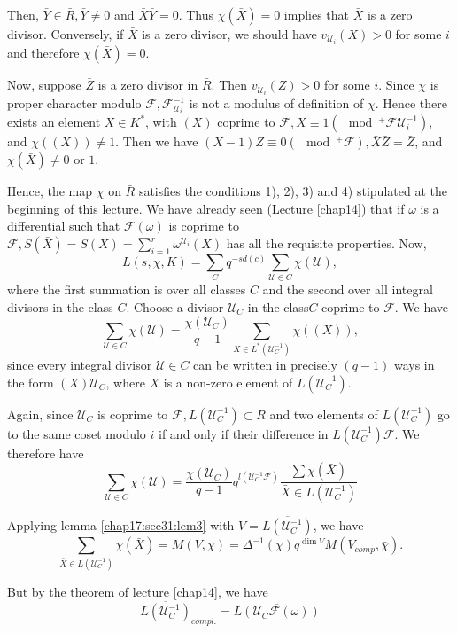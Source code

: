 Then, $\bar{Y} \in \bar{R}, \bar{Y}\neq 0$ and
$\bar{X}\bar{Y}=0$. Thus $\chi (\bar{X})=0$ implies that $\bar{X}$  is
a zero divisor. Conversely, if $\bar{X}$ is a zero divisor, we should
have $v_{\mathscr{U}_i}(X)>0$ for some $i$ and therefore $\chi
(\bar{X})=0$. 

Now, suppose $\bar{Z}$ is a zero divisor in $\bar{R}$. Then
$v_{\mathscr{U}_i}(Z)>0$ for some $i$. Since $\chi$ is proper
character modulo $\mathcal{F},\mathcal{F}_{\mathscr{U}_i}^{-1}$ is not
a modulus of definition of $\chi$. Hence there exists an element $X
\in K^*$, with $(X)$ coprime to $\mathcal{F}, X \equiv 1 (\mod^+
\mathcal{F} \mathscr{U}_i^{-1})$, and $\chi((X))\neq 1$. Then we
have $(X-1)Z \equiv 0(\mod^+ \mathcal{F}), \bar{X}\bar{Z}=\bar{Z}$,
and $\chi(\bar{X})\neq 0$ or $1$. 

Hence, the map $\chi$ on $\bar{R}$ satisfies the conditions 1), 2), 3)
and 4) stipulated at the beginning of this lecture. We have already
seen (Lecture \ref{chap14}) that if $\omega$ is a differential such that
$\mathcal{F}(\omega)$ is coprime to $\mathcal{F}, S(\bar{X})=S(X)=\sum
\limits^r_{i=1}\omega ^{\mathscr{U}_i}(X)$ has all the requisite
properties. Now, 
$$
L(s, \chi ,K)=\sum_C q^{-sd(c)} \sum_{\mathscr{U} \in C}\chi(\mathscr{U}),
$$
where the first summation is over all classes $C$ and the second over
all integral divisors in the class $C$. Choose a divisor
$\mathscr{U}_C$ in the class\pageoriginale $C$ coprime to $\mathcal{F}$. We have 
$$
\sum_{\mathscr{U} \in C}\chi (\mathscr{U})= \frac{\chi
  (\mathscr{U}_C)}{q-1}\sum_{X \in L^* (\mathscr{U}_C^{-1})}\chi
((X)), 
$$
since every integral divisor $\mathscr{U}\in C$ can be written in
precisely $(q-1)$ ways in the form $(X)\mathscr{U}_C$, where $X$ is a
non-zero element of $L(\mathscr{U}_C^{-1})$.  

Again, since $\mathscr{U}_C$ is coprime to $\mathcal{F},
L(\mathscr{U}_C^{-1})\subset R$ and two elements of
$L(\mathscr{U}_C^{-1})$ go to the same coset modulo $i$ if and only
if their difference in $L(\mathscr{U}_C^{-1})\mathcal{F}$. We
therefore have 
$$
\sum_{\mathscr{U} \in
  C}\chi(\mathscr{U})=\frac{\chi(\mathscr{U}_C)}{q-1}
q^{l(\mathscr{U}_C^{-1}\mathcal{F})}\frac{\sum \chi
  (\bar{X})}{\bar{X}\in L(\mathscr{U}_C^{-1})} 
$$

Applying lemma \ref{chap17:sec31:lem3} with $V=\overline{L(\mathscr{U}_C^{-1})}$, we have
$$
\sum_{\bar{X}\in L(\mathscr{U}_C^{-1})}\chi
(\bar{X})=M(V,\chi)=\Delta^{-1}(\chi)q^{\dim V}M(V_{comp},
\bar{\chi}). 
$$

But by the theorem of lecture \ref{chap14}, we have
$$
\overline{L(\mathscr{U}_C^{-1})}_{compl.} =\overline{L(\mathscr{U}_C
  \mathcal{F}(\omega))} 
$$

